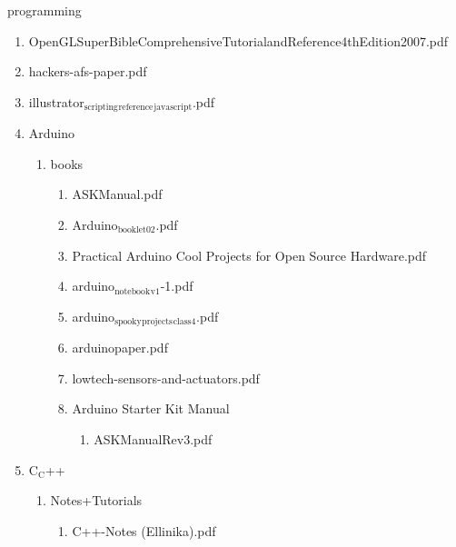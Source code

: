 \documentclass[11pt]{article}
\begin{document}
\item programming
\label{sec-1-1-1-1-38}
\begin{enumerate}
\item OpenGLSuperBibleComprehensiveTutorialandReference4thEdition2007.pdf
\label{sec-1-1-1-1-38-1}

\item hackers-afs-paper.pdf
\label{sec-1-1-1-1-38-2}

\item illustrator$_{\text{scripting}}$$_{\text{reference}}$$_{\text{javascript}}$.pdf
\label{sec-1-1-1-1-38-3}

\item Arduino
\label{sec-1-1-1-1-38-4}
\begin{enumerate}
\item books
\label{sec-1-1-1-1-38-4-1}
\begin{enumerate}
\item ASKManual.pdf
\label{sec-1-1-1-1-38-4-1-1}

\item Arduino$_{\text{booklet02}}$.pdf
\label{sec-1-1-1-1-38-4-1-2}

\item Practical Arduino Cool Projects for Open Source Hardware.pdf
\label{sec-1-1-1-1-38-4-1-3}

\item arduino$_{\text{notebook}}$$_{\text{v1}}$-1.pdf
\label{sec-1-1-1-1-38-4-1-4}

\item arduino$_{\text{spooky}}$$_{\text{projects}}$$_{\text{class4}}$.pdf
\label{sec-1-1-1-1-38-4-1-5}

\item arduinopaper.pdf
\label{sec-1-1-1-1-38-4-1-6}

\item lowtech-sensors-and-actuators.pdf
\label{sec-1-1-1-1-38-4-1-7}

\item Arduino Starter Kit Manual
\label{sec-1-1-1-1-38-4-1-8}
\begin{enumerate}
\item ASKManualRev3.pdf
\label{sec-1-1-1-1-38-4-1-8-1}
\end{enumerate}
\end{enumerate}
\end{enumerate}

\item C$_{\text{C}}$++
\label{sec-1-1-1-1-38-5}
\begin{enumerate}
\item Notes+Tutorials
\label{sec-1-1-1-1-38-5-1}
\begin{enumerate}
\item C++-Notes (Ellinika).pdf
\label{sec-1-1-1-1-38-5-1-1}


\end{enumerate}
\end{enumerate}
\end{enumerate}
\end{document}
